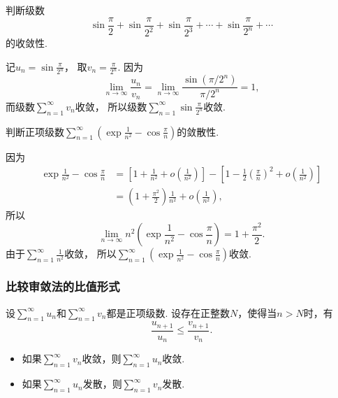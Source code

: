 \begin{example}
\newcommand\sinfrac[1][]{\sin\frac{\pi}{2^{#1}}}
判断级数\[
	\sinfrac + \sinfrac[2] + \sinfrac[3] + \dotsb + \sinfrac[n] + \dotsb
\]的收敛性.
\begin{solution}
记\(u_n = \sin\frac{\pi}{2^n}\)，
取\(v_n = \frac{\pi}{2^n}\).
因为\[
	\lim_{n\to\infty} \frac{u_n}{v_n}
	= \lim_{n\to\infty} \frac{\sin(\pi/2^n)}{\pi/2^n}
	= 1,
\]
而级数\(\sum_{n=1}^\infty v_n\)收敛，
所以级数\(\sum_{n=1}^\infty \sin\frac{\pi}{2^n}\)收敛.
\end{solution}
\end{example}

\begin{example}
判断正项级数\(\sum_{n=1}^\infty \left(\exp\frac1{n^2}-\cos\frac\pi{n}\right)\)的敛散性.
\begin{solution}
因为\begin{align*}
	\exp\frac1{n^2}-\cos\frac\pi{n}
	&= \left[1+\frac1{n^2}+o\left(\frac1{n^2}\right)\right]
	- \left[1-\frac12\left(\frac\pi{n}\right)^2+o\left(\frac1{n^2}\right)\right] \\
	&= \left(1+\frac{\pi^2}2\right) \frac1{n^2} + o\left(\frac1{n^2}\right),
\end{align*}
所以\[
	\lim_{n\to\infty} n^2 \left(\exp\frac1{n^2}-\cos\frac\pi{n}\right)
	= 1+\frac{\pi^2}2.
\]
由于\(\sum_{n=1}^\infty \frac1{n^2}\)收敛，
所以\(\sum_{n=1}^\infty \left(\exp\frac1{n^2}-\cos\frac\pi{n}\right)\)收敛.
\end{solution}
\end{example}

\subsubsection{比较审敛法的比值形式}
\begin{theorem}\label{theorem:无穷级数.比较审敛法的比值形式}
设\(\sum_{n=1}^\infty u_n\)和\(\sum_{n=1}^\infty v_n\)都是正项级数.
设存在正整数\(N\)，使得当\(n>N\)时，有\[
	\frac{u_{n+1}}{u_n} \leq \frac{v_{n+1}}{v_n}.
\]
\begin{itemize}
	\item 如果\(\sum_{n=1}^\infty v_n\)收敛，则\(\sum_{n=1}^\infty u_n\)收敛.
	\item 如果\(\sum_{n=1}^\infty u_n\)发散，则\(\sum_{n=1}^\infty v_n\)发散.
\end{itemize}
\end{theorem}

